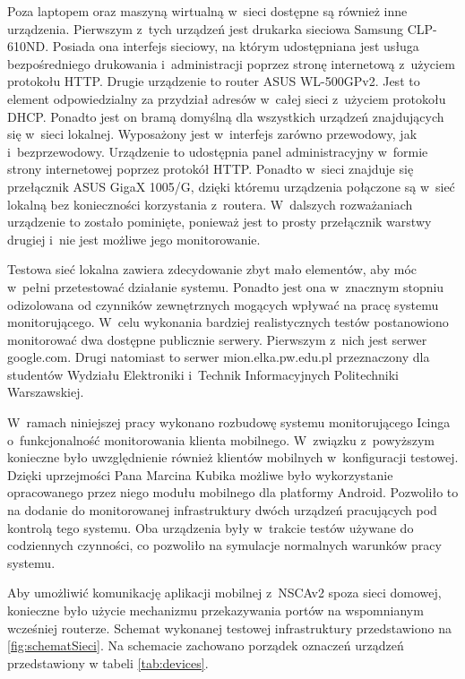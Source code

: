 Poza laptopem oraz maszyną wirtualną w~sieci dostępne są również inne
urządzenia. Pierwszym z~tych urządzeń jest drukarka sieciowa Samsung
CLP-610ND. Posiada ona interfejs sieciowy, na którym udostępniana jest
usługa bezpośredniego drukowania i~administracji poprzez stronę
internetową z~użyciem protokołu HTTP. Drugie urządzenie to router ASUS
WL-500GPv2. Jest to element odpowiedzialny za przydział adresów
w~całej sieci z~użyciem protokołu DHCP. Ponadto jest on bramą domyślną
dla wszystkich urządzeń znajdujących się w~sieci lokalnej. Wyposażony
jest w~interfejs zarówno przewodowy, jak i~bezprzewodowy. Urządzenie
to udostępnia panel administracyjny w~formie strony internetowej
poprzez protokół HTTP. Ponadto w~sieci znajduje się przełącznik ASUS
GigaX 1005/G, dzięki któremu urządzenia połączone są w~sieć lokalną
bez konieczności korzystania z~routera. W~dalszych rozważaniach
urządzenie to zostało pominięte, ponieważ jest to prosty przełącznik
warstwy drugiej i~nie jest możliwe jego monitorowanie.

Testowa sieć lokalna zawiera zdecydowanie zbyt mało elementów, aby móc
w~pełni przetestować działanie systemu. Ponadto jest ona w~znacznym
stopniu odizolowana od czynników zewnętrznych mogących wpływać na
pracę systemu monitorującego. W~celu wykonania bardziej realistycznych
testów postanowiono monitorować dwa dostępne publicznie
serwery. Pierwszym z~nich jest serwer google.com. Drugi natomiast to
serwer mion.elka.pw.edu.pl przeznaczony dla studentów Wydziału
Elektroniki i~Technik Informacyjnych Politechniki Warszawskiej.

W~ramach niniejszej pracy wykonano rozbudowę systemu monitorującego
Icinga o~funkcjonalność monitorowania klienta mobilnego. W~związku
z~powyższym konieczne było uwzględnienie również klientów mobilnych
w~konfiguracji testowej. Dzięki uprzejmości Pana Marcina Kubika
możliwe było wykorzystanie opracowanego przez niego modułu mobilnego
dla platformy Android. Pozwoliło to na dodanie do monitorowanej
infrastruktury dwóch urządzeń pracujących pod kontrolą tego
systemu. Oba urządzenia były w~trakcie testów używane do codziennych
czynności, co pozwoliło na symulacje normalnych warunków pracy
systemu.

Aby umożliwić komunikację aplikacji mobilnej z~NSCAv2 spoza sieci
domowej, konieczne było użycie mechanizmu przekazywania portów na
wspomnianym wcześniej routerze. Schemat wykonanej testowej
infrastruktury przedstawiono na \ref{fig:schematSieci}. Na schemacie
zachowano porządek oznaczeń urządzeń przedstawiony w tabeli
\ref{tab:devices}.

